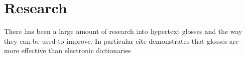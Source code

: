 \chapter{Research}
There has been a large amount of research into hypertext glosses and the way they can be used to improve. In particular {cite} demonstrates that glosses are more effective than electronic dictionaries 